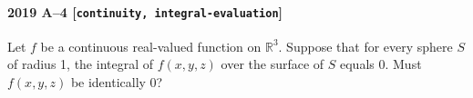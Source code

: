 \paragraph{2019 A--4 \textnormal{[\texttt{continuity, integral-evaluation}]}}
Let $f$ be a continuous real-valued function on $\mathbb{R}^3$. Suppose that for every sphere $S$ of radius 1,
the integral of $f(x,y,z)$ over the surface of $S$ equals 0. Must $f(x,y,z)$ be identically 0?
